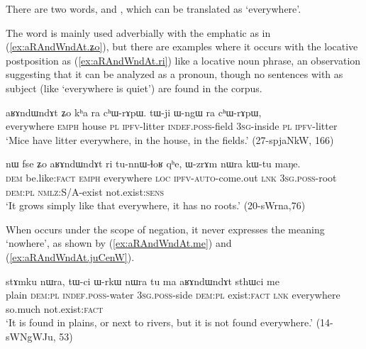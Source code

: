 There are two words,  and , which can be translated as `everywhere'.

The word  is mainly used adverbially with the emphatic  as in (\ref{ex:aRAndWndAt.ʑo}), but there are examples where it occurs with the locative postposition  as (\ref{ex:aRAndWndAt.ri}) like a locative noun phrase, an observation suggesting that it can be analyzed as a pronoun, though no sentences with  as subject (like `everywhere is quiet') are found in the corpus.

 \begin{exe}
\ex \label{ex:aRAndWndAt.ʑo}
\gll  aʁɤndɯndɤt ʑo kʰa ra cʰɯ-rɤpɯ. tɯ-ji ɯ-ngɯ ra cʰɯ-rɤpɯ, \\
everywhere \textsc{emph} house \textsc{pl} \textsc{ipfv}-litter \textsc{indef.poss}-field \textsc{3sg}-inside \textsc{pl} \textsc{ipfv}-litter \\
\glt `Mice have litter everywhere, in the house, in the fields.' (27-spjaNkW, 166)
\end{exe} 

 \begin{exe}
\ex \label{ex:aRAndWndAt.ri}
\gll nɯ fse ʑo aʁɤndɯndɤt ri tu-nnɯ-ɬoʁ qʰe, ɯ-zrɤm nɯra kɯ-tu maŋe. \\
\textsc{dem} be.like:\textsc{fact} \textsc{emph} everywhere \textsc{loc} \textsc{ipfv}-\textsc{auto}-come.out \textsc{lnk} \textsc{3sg.poss}-root \textsc{dem:pl} \textsc{nmlz}:S/A-exist not.exist:\textsc{sens} \\
\glt `It grows simply like that everywhere, it has no roots.' (20-sWrna,76)
\end{exe} 

When  occurs under the scope of negation, it never expresses the meaning `nowhere', as shown by (\ref{ex:aRAndWndAt.me}) and (\ref{ex:aRAndWndAt.juCenW}).

\begin{exe}
\ex \label{ex:aRAndWndAt.me}
\gll stɤmku nɯra, tɯ-ci ɯ-rkɯ nɯra tu ma aʁɤndɯndɤt sthɯci me \\
plain \textsc{dem:pl} \textsc{indef.poss}-water \textsc{3sg.poss}-side  \textsc{dem:pl} exist:\textsc{fact} \textsc{lnk} everywhere so.much not.exist:\textsc{fact} \\
\glt `It is found in plains, or next to rivers, but it is not found everywhere.' (14-sWNgWJu, 53)
\end{exe} 

